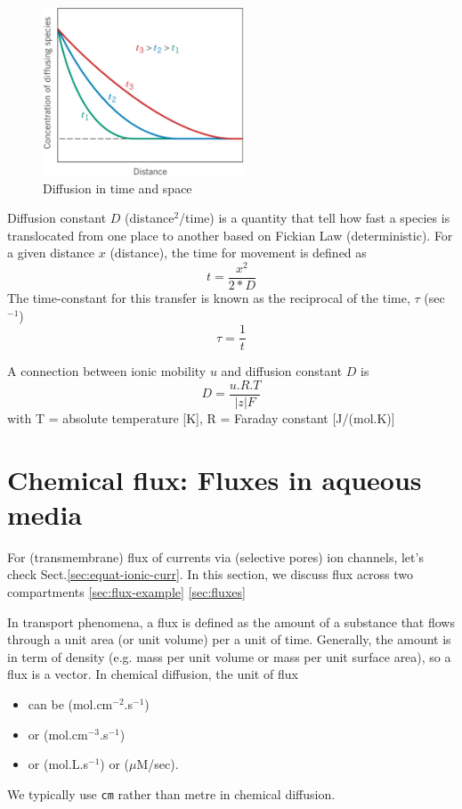 \begin{figure}[hbtp]
  \centerline{\includegraphics[height=5cm,
    angle=0]{./images/diffusion-in-time-space.eps}}
\caption{Diffusion in time and space}
\label{fig:diffusion-in-time-space}
\end{figure}


Diffusion constant $D$ (distance$^2$/time) is a quantity that tell how fast a
species is translocated from one place to another based on Fickian Law
(deterministic). For a given distance $x$ (distance), the time for movement
is defined as
\begin{equation}
t = \frac{x^2}{2*D}
\end{equation}
The time-constant for this transfer is known as the reciprocal of the time,
$\tau$ (sec$^{-1}$)
\begin{equation}
\tau = \frac{1}{t}
\end{equation}

\begin{framed}
  A connection between ionic mobility $u$ and diffusion constant $D$
  is
  \begin{equation}
    \label{eq:1227}
    D = \frac{u.R.T}{|z|F}
  \end{equation}
with T = absolute temperature [K], R = Faraday constant [J/(mol.K)]
\end{framed}

\section{Chemical flux: Fluxes in aqueous media}
\label{sec:chemical-flux}

For (transmembrane) flux of currents via (selective pores) ion channels, let's
check Sect.\ref{sec:equat-ionic-curr}. In this section, we discuss flux across
two compartments
\ref{sec:flux-example}
\ref{sec:fluxes}

In transport phenomena, a flux is defined as the amount of a substance
that flows through a unit area (or unit volume) per a unit of
time. Generally, the amount is in term of density (e.g. mass per unit
volume or mass per unit surface area), so a flux is a vector.  In
chemical diffusion, the unit of flux
\begin{itemize}
\item can be (mol.cm$^{-2}$.s$^{-1}$) 
\item  or (mol.cm$^{-3}$.s$^{-1}$)

\item or (mol.L.s$^{-1}$) or ($\mu$M/sec).
\end{itemize}
We typically use \verb!cm! rather than metre in chemical diffusion.

